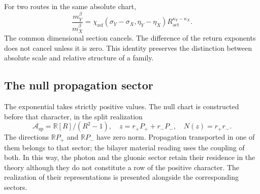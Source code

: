 For two routes in the same absolute chart,
\[
 \frac{m_Y^\beta}{m_X^\beta}
 =\chi_{\mathrm{ref}}(\sigma_Y-\sigma_X,\eta_Y-\eta_X)
 R_{\mathrm{act}}^{\kappa_Y-\kappa_X}.
\]
The common dimensional section cancels. The difference of the return
exponents does not cancel unless it is zero. This identity preserves the
distinction between absolute scale and relative structure of a family.

\subsection{The null propagation sector}

The exponential takes strictly positive values. The null chart is
constructed before that character, in the split realization
\[
 \mathcal A_{\mathrm{sp}}=\mathbb R[R]/(R^2-1),\quad
 z=r_+P_++r_-P_-,\quad N(z)=r_+r_-.
\]
The directions \(\mathbb RP_+\) and \(\mathbb RP_-\) have zero
norm. Propagation transported in one of them belongs to that sector;
the bilayer material reading uses the coupling of both. In this way,
the photon and the gluonic sector retain their residence in the theory although
they do not constitute a row of the positive character. The realization of their
representations is presented alongside the corresponding sectors.

